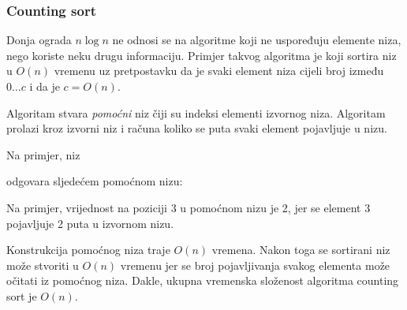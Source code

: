 \subsubsection{Counting sort}


Donja ograda $n \log n$ ne odnosi se na
algoritme koji ne uspoređuju elemente niza,
nego koriste neku drugu informaciju.
Primjer takvog algoritma je
 koji sortira niz u
$O(n)$ vremenu uz pretpostavku da je svaki element niza
cijeli broj između $0 \ldots c$ i da je $c=O(n)$.

Algoritam stvara \emph{pomoćni} niz
čiji su indeksi elementi izvornog niza.
Algoritam prolazi kroz izvorni niz
i računa koliko se puta svaki element
pojavljuje u nizu.
\newpage

Na primjer, niz
\begin{center}
\end{center}
odgovara sljedećem pomoćnom nizu:
\begin{center}
\end{center}

Na primjer, vrijednost na poziciji 3
u pomoćnom nizu je 2,
jer se element 3 pojavljuje 2 puta
u izvornom nizu.

Konstrukcija pomoćnog niza
traje $O(n)$ vremena. Nakon toga se sortirani niz
može stvoriti u $O(n)$ vremenu jer se
broj pojavljivanja svakog elementa može očitati
iz pomoćnog niza.
Dakle, ukupna vremenska složenost algoritma counting
sort je $O(n)$.

